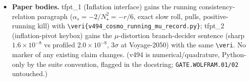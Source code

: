 \begin{itemize}[leftmargin=1.5em]
gains the two rows ($\alpha_s$ \mC\ with the $-1.33\sigma$ P-ACT-LB pull and the positive-running kill;
$\mu$-distortion \mC\ data-limited with the Voyage-2050 branch split); website \texttt{lib/predictions.ts}
gains the matching cards \texttt{alpha-s-running} and \texttt{mu-distortion} (confrontation $+$ experiment
blocks pointing at \texttt{experiments/tfpt-discovery}); the cosmology DAG node lists \texttt{v494} and
states the running/$\mu$ readouts.
\item \textbf{Paper bodies.} tfpt\_1 (Inflation interface) gains the running consistency-relation paragraph
($\alpha_s=-2/N_\star^2=-r/6$, exact slow roll, pulls, positive-running kill) with
\texttt{\textbackslash veri\{v494\_cosmo\_running\_mu\_record.py\}}; tfpt\_2 (inflation-pivot keybox) gains
the $\mu$-distortion branch-decider sentence (sharp $1.6\times10^{-8}$ vs profiled $2.0\times10^{-8}$,
$3\sigma$ at Voyage-2050) with the same \texttt{\textbackslash veri}. No marker of any existing claim
changes. (v494 is numerical/quadrature, Python-only by the suite convention, flagged in the docstring;
\texttt{GATE.WOLFRAM.01/02} untouched.)
\end{itemize}

